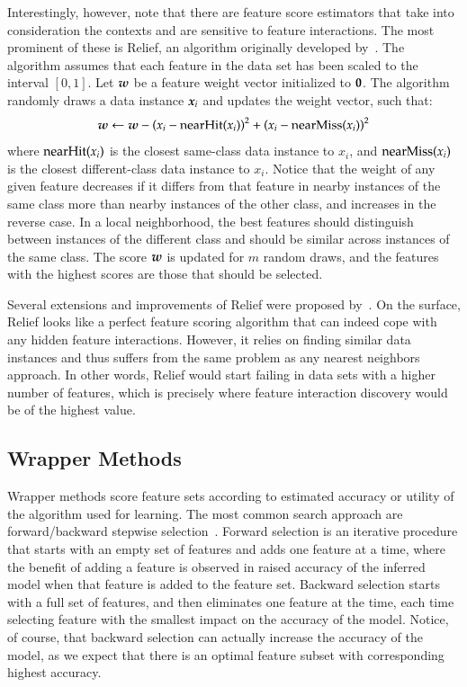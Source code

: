 \begin{refsection}
Interestingly, however, note that there are feature score estimators that take into consideration the contexts and are sensitive to feature interactions. The most prominent of these is Relief, an algorithm originally developed by~\citet{Kira1992}. The algorithm assumes that each feature in the data set has been scaled to the interval $[0,1]$. Let $\boldsymbol{w}$ be a feature weight vector initialized to $\boldsymbol{0}$. The algorithm randomly draws a data instance $\boldsymbol{x}_i$ and updates the weight vector, such that:
$$
\boldsymbol{w}\gets\boldsymbol{w}-\left(x_i - {\rm nearHit}(x_i)\right)^2 + \left(x_i - {\rm nearMiss}(x_i)\right)^2
$$
where ${\rm nearHit}(x_i)$ is the closest same-class data instance to $x_i$, and ${\rm nearMiss}(x_i)$ is the closest different-class data instance to $x_i$. Notice that the weight of any given feature decreases if it differs from that feature in nearby instances of the same class more than nearby instances of the other class, and increases in the reverse case. In a local neighborhood, the best features should distinguish between instances of the different class and should be similar across instances of the same class. The score $\boldsymbol{w}$ is updated for $m$ random draws, and the features with the highest scores are those that should be selected. 

Several extensions and improvements of Relief were proposed by~\citep{Kononenko1997}. On the surface, Relief looks like a perfect feature scoring algorithm that can indeed cope with any hidden feature interactions. However, it relies on finding similar data instances and thus suffers from the same problem as any nearest neighbors approach. In other words, Relief would start failing in data sets with a higher number of features, which is precisely where feature interaction discovery would be of the highest value.

\subsection*{Wrapper Methods}

Wrapper methods score feature sets according to estimated accuracy or utility of the algorithm used for learning. The most common search approach are forward/backward stepwise selection~\citep{Guyon2003}. Forward selection is an iterative procedure that starts with an empty set of features and adds one feature at a time, where the benefit of adding a feature is observed in raised accuracy of the inferred model when that feature is added to the feature set. Backward selection starts with a full set of features, and then eliminates one feature at the time, each time selecting feature with the smallest impact on the accuracy of the model. Notice, of course, that backward selection can actually increase the accuracy of the model, as we expect that there is an optimal feature subset with corresponding highest accuracy.


\end{refsection}
